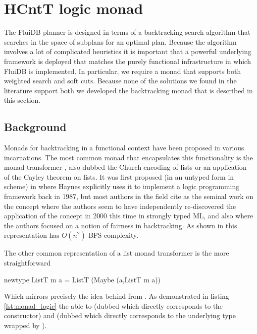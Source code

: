 \section{HCntT logic monad}

The FluiDB planner is designed in terms of a backtracking search
algorithm that searches in the space of subplans for an optimal
plan. Because the algorithm involves a lot of complicated heuristics
it is important that a powerful underlying framework is deployed that
matches the purely functional infrastructure in which FluiDB is
implemented.  In particular, we require a monad that supports both
weighted search and soft cuts. Because none of the solutions we found
in the literature support both we developed the 
backtracking monad that is described in this section.

\subsection{Background}

Monads for backtracking in a functional context have been proposed in
various incarnations.  The most common monad that encapsulates this functionality is the  monad transformer
, also
dubbed the Church encoding of lists or an application of the Cayley
theorem on lists. It was first proposed (in an untyped form in
scheme) in \cite{haynesLogicContinuations1987} where Haynes explicitly
uses it to implement a logic programming framework back in 1987, but
most authors in the field cite
\cite{hinzeDerivingBacktrackingMonad2000a} as the seminal work on the
concept where the authors seem to have independently re-discovered the
application of the concept in 2000 this time in strongly typed ML, and also
\cite{kiselyovBacktrackingInterleavingTerminating} where the authors
focused on a notion of fairness in backtracking. As shown in
\cite{kidneyAlgebrasWeightedSearch2021} this representation has
\(O(n^2)\) BFS complexity.

The other common representation of a list monad transformer is the more
straightforward

\begin{haskellcode}
newtype ListT m a = ListT (Maybe (a,ListT m a))
\end{haskellcode}

Which mirrors precisely the idea behind  from
\cite{kiselyovBacktrackingInterleavingTerminating}. As demonstrated in
listing \ref{lst:monad_logic} the  able to
 (dubbed  which directly corresponds to the  constructor) and  (dubbed
 which directly corresponds to the underlying type wrapped by ).

